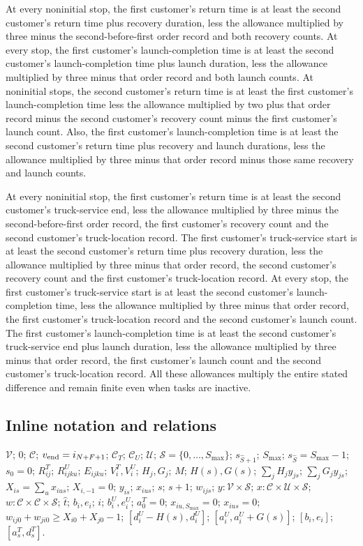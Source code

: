 \documentclass[10pt]{article}
\begin{document}
At every noninitial stop, the first customer's return time is at least the second customer's return time plus recovery duration, less the allowance multiplied by three minus the second-before-first order record and both recovery counts. At every stop, the first customer's launch-completion time is at least the second customer's launch-completion time plus launch duration, less the allowance multiplied by three minus that order record and both launch counts. At noninitial stops, the second customer's return time is at least the first customer's launch-completion time less the allowance multiplied by two plus that order record minus the second customer's recovery count minus the first customer's launch count. Also, the first customer's launch-completion time is at least the second customer's return time plus recovery and launch durations, less the allowance multiplied by three minus that order record minus those same recovery and launch counts.

At every noninitial stop, the first customer's return time is at least the second customer's truck-service end, less the allowance multiplied by three minus the second-before-first order record, the first customer's recovery count and the second customer's truck-location record. The first customer's truck-service start is at least the second customer's return time plus recovery duration, less the allowance multiplied by three minus that order record, the second customer's recovery count and the first customer's truck-location record. At every stop, the first customer's truck-service start is at least the second customer's launch-completion time, less the allowance multiplied by three minus that order record, the first customer's truck-location record and the second customer's launch count. The first customer's launch-completion time is at least the second customer's truck-service end plus launch duration, less the allowance multiplied by three minus that order record, the first customer's launch count and the second customer's truck-location record. All these allowances multiply the entire stated difference and remain finite even when tasks are inactive.

\subsection*{Inline notation and relations}
$\mathcal V$; $0$; $\mathcal C$; $v_{\rm end}=i_{N+F+1}$; $\mathcal C_T$; $\mathcal C_U$; $\mathcal U$; $\mathcal S=\{0,\ldots,S_{\max}\}$; $s_{\hat S+1}$; $S_{\max}$; $s_{\hat S}=S_{\max}-1$; $s_0=0$; $R^T_{ij}$; $R^U_{ijku}$; $E_{ijku}$; $V^T_i,V^U_i$; $H_j,G_j$; $M$; $H(s),G(s)$; $\sum_j H_jy_{js}$; $\sum_jG_jy_{js}$; $X_{is}=\sum_u x_{ius}$; $X_{i,-1}=0$; $y_{is}$; $x_{ius}$; $s$; $s+1$; $w_{ijs}$; $y:\mathcal V\times\mathcal S$; $x:\mathcal C\times\mathcal U\times\mathcal S$; $w:\mathcal C\times\mathcal C\times\mathcal S$; $\hat t$; $b_i,e_i$; $i$; $b_i^U,e_i^U$; $a^T_0=0$; $x_{iu,S_{\max}}=0$; $x_{ius}=0$; $w_{ij0}+w_{ji0}\ge X_{i0}+X_{j0}-1$; $[d_i^U-H(s),d_i^U]$; $[a_i^U,a_i^U+G(s)]$; $[b_i,e_i]$; $[a_s^T,d_s^T]$.
\end{document}

